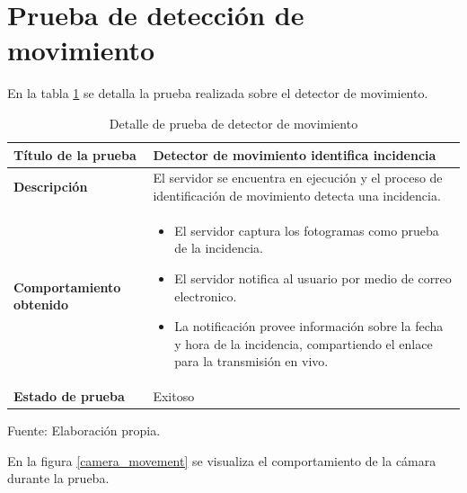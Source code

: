 \section{Prueba de detección de movimiento}

En la tabla \ref{table_movement_detection} se detalla la prueba realizada sobre el detector de movimiento.\\

\begin{table}[H]
    \caption{Detalle de prueba de detector de movimiento}
    \begin{center}
        \begin{tabular}{|>{\centering}p{}|m{}<{\centering}|} 
            \hline
            \textbf{Título de la prueba} & \textbf{Detector de movimiento identifica incidencia} \\
            \hline
            \textbf{Descripción} & El servidor se encuentra en ejecución y el proceso de identificación de movimiento detecta una incidencia.\\
            \hline
            \textbf{Comportamiento obtenido} & 
            \begin{itemize}
                \item El servidor captura los fotogramas como prueba de la incidencia.
                \item El servidor notifica al usuario por medio de correo electronico.
                \item La notificación provee información sobre la fecha y hora de la incidencia, compartiendo el enlace para la transmisión en vivo.
            \end{itemize} \\ 
            \hline
            \textbf{Estado de prueba} & Exitoso \\
            \hline
        \end{tabular}
    \end{center}
    \begin{center}
        Fuente: Elaboración propia.
        \label{table_movement_detection}
    \end{center}
\end{table}

En la figura \ref{camera_movement} se visualiza el comportamiento de la cámara durante la prueba.

